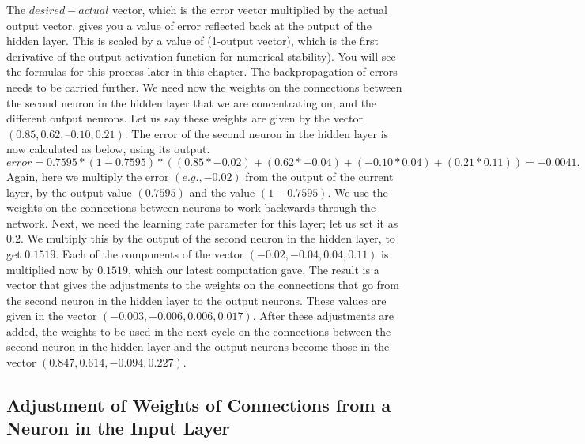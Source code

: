\documentclass[12pt, right open]{memoir}
\begin{document}
The $desired-actual$ vector, which is the error vector multiplied by the actual output vector, gives you a value of error reflected back at the output of the hidden layer. This is scaled by a value of (1-output vector), which is the first derivative of the output activation function for numerical stability). You will see the
formulas for this process later in this chapter. The backpropagation of errors needs to be carried further. We need now the weights on the connections between the second neuron in the hidden layer that we are concentrating on, and the different output neurons. Let us say these weights are given by the vector $(0.85, 0.62, –0.10, 0.21)$. The error of the second neuron in the hidden layer is now calculated as below, using its output.\\

$error = 0.7595 * (1 - 0.7595) * ( (0.85 * -0.02) + (0.62 * -0.04)
+ ( -0.10 * 0.04) + (0.21 * 0.11)) = -0.0041.$\\

Again, here we multiply the error $(e.g., -0.02)$ from the output of the current layer, by the output value $(0.7595)$ and the value $(1-0.7595)$. We use the weights on the connections between neurons to work backwards through the network. Next, we need the learning rate parameter for this layer; let us set it as $0.2$. We multiply this by the output of the second neuron in the hidden layer, to get $0.1519$. Each of the components of the vector $(-0.02, -0.04, 0.04, 0.11)$ is multiplied now by $0.1519$, which our latest computation gave. The result is a vector that gives the adjustments to the weights on the connections that go from the second neuron in the hidden layer to the output neurons. These values are given in the vector $(-0.003, -0.006, 0.006,0.017)$. After these adjustments are added, the weights to be used in the next cycle on the connections between the second neuron in the hidden layer and the output neurons become those in the vector
$(0.847, 0.614, -0.094, 0.227)$.

\subsection{Adjustment of Weights of Connections from a Neuron in
the Input Layer}
\end{document}
